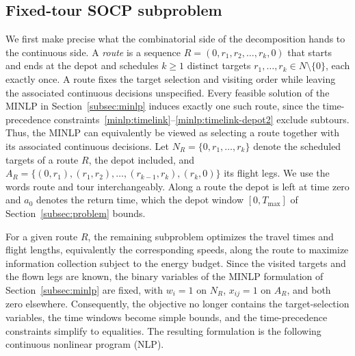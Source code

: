 \documentclass[11pt]{article}
\let\originalsubsection\subsection
\renewcommand{\subsection}{\FloatBarrier\originalsubsection}
\begin{document}
\subsection{Fixed-tour SOCP subproblem}\label{subsec:socp}

We first make precise what the combinatorial side of the decomposition hands
to the continuous side. A \emph{route} is a sequence $R = (0, r_1, r_2, \ldots,
r_k, 0)$ that starts and ends at the depot and schedules $k \ge 1$ distinct targets
$r_1, \ldots, r_k \in N \setminus \{0\}$, each exactly once. A route fixes the
target selection and visiting order while leaving the associated continuous decisions
unspecified. Every feasible solution of the MINLP in Section~\ref{subsec:minlp}
induces exactly one such route, since the time-precedence
constraints~\eqref{minlp:timelink}--\eqref{minlp:timelink-depot2}
exclude subtours. Thus, the MINLP can equivalently be viewed as selecting a route
together with its associated continuous decisions. Let $N_R = \{0, r_1, \ldots, r_k\}$
denote the scheduled targets of a route $R$, the depot included, and $A_R = \{(0,r_1), (r_1,r_2), \ldots, (r_{k-1},r_k),
(r_k,0)\}$ its flight legs. We use the words route and tour interchangeably. Along a route the depot is left at time zero and $a_0$ denotes the return time, which the depot window $[0, T_{\max}]$ of Section~\ref{subsec:problem} bounds.

For a given route $R$, the remaining subproblem optimizes the travel times and flight lengths, equivalently the corresponding speeds, along the route to maximize information collection subject to the energy budget. Since the visited targets and the flown legs are known, the binary variables of the MINLP formulation of Section~\ref{subsec:minlp} are fixed, with $w_i = 1$ on $N_R$, $x_{ij} = 1$ on $A_R$, and both zero elsewhere. Consequently, the objective no longer contains the target-selection variables, the time windows become simple bounds, and the time-precedence constraints simplify to equalities. The resulting formulation is the following continuous nonlinear program (NLP).
\end{document}
